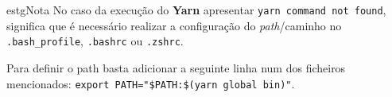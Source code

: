 \begin{mybox}{estg}{Nota}
	No caso da execução do \textbf{Yarn} apresentar \verb|yarn command not found|, significa que é necessário realizar a configuração do \textit{path}/caminho no \verb|.bash_profile|, \verb|.bashrc| ou \verb|.zshrc|.

	\vspace{5pt}

	Para definir o path basta adicionar a seguinte linha num dos ficheiros mencionados: \verb|export PATH="$PATH:$(yarn global bin)"|.
\end{mybox}